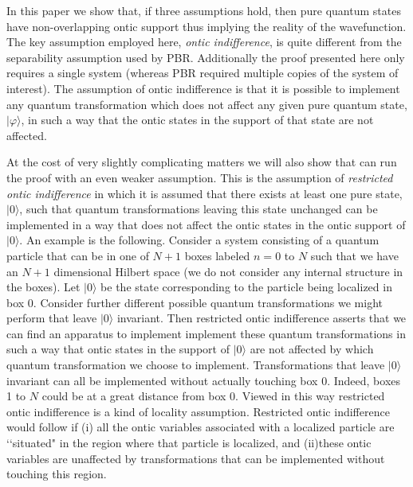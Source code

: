 \documentclass[12pt]{article}
\begin{document}
In this paper we show that, if three assumptions hold, then pure quantum states have non-overlapping ontic support thus implying the reality of the wavefunction.   The key assumption employed here,
\emph{ontic indifference}, is quite different from the separability assumption used by PBR.  Additionally the proof presented here only requires a single system (whereas PBR required
multiple copies of the system of interest).  The assumption of ontic indifference is that it is possible to implement any quantum transformation which does not affect any given pure quantum
state, $|\varphi\rangle$, in such a way that the ontic states in the support of that state are not affected.

At the cost of very slightly complicating matters we will also show that can run the proof with an even weaker assumption.  This is the assumption of \emph{restricted ontic indifference} in
which it is assumed that there exists at least one pure state, $|0\rangle$, such that quantum transformations leaving this state unchanged can be implemented in a way that does not affect
the ontic states in the ontic support of $|0\rangle$.  An example is the following. Consider a system consisting of a quantum particle that can be in one of $N+1$ boxes labeled $n=0$ to $N$
such that we have an $N+1$ dimensional Hilbert space (we do not consider any internal structure in the boxes).  Let $|0\rangle$ be the state corresponding to the particle being localized in
box 0.  Consider further different possible quantum transformations we might perform that leave $|0\rangle$ invariant.  Then restricted ontic indifference asserts that we can find an
apparatus to implement implement these quantum transformations in such a way that ontic states in the support of $|0\rangle$ are not affected by which quantum transformation we choose to
implement.  Transformations that leave $|0\rangle$ invariant can all be implemented without actually touching box 0.  Indeed, boxes 1 to $N$ could be at a great distance from box 0.  Viewed
in this way restricted ontic indifference is a kind of locality assumption.  Restricted ontic indifference would follow if (i) all the ontic variables associated with a localized particle are \lq\lq situated" in the region where that particle is localized, and (ii)these ontic variables are unaffected by transformations that can be implemented without touching this region.
\end{document}
